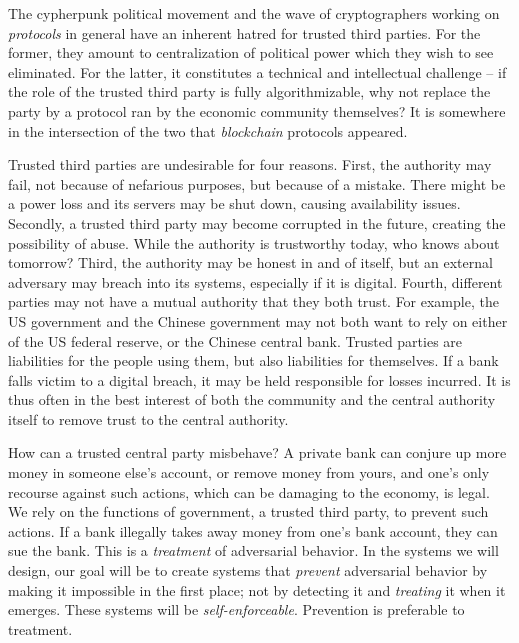 The cypherpunk political movement and the wave of
cryptographers working on \emph{protocols} in general have an inherent hatred
for trusted third parties. For the former, they amount to
centralization of political power which they wish to see eliminated. For the
latter, it constitutes a technical and intellectual challenge -- if the role of the trusted
third party is fully algorithmizable, why not replace the party by a protocol
ran by the economic community themselves? It is somewhere in the intersection of the
two that \emph{blockchain} protocols appeared.

Trusted third parties are undesirable for four reasons.
First, the authority may fail, not because of nefarious purposes, but because of a mistake.
There might be a power loss and its servers may be shut down, causing availability issues.
Secondly, a trusted third party
may become corrupted in the future, creating the possibility of abuse. While the authority
is trustworthy today, who knows about tomorrow?
Third, the
authority may be honest in and of itself, but an external adversary may breach into its
systems, especially if it is digital.
Fourth, different parties may not have a mutual authority that they both trust.
For example, the US government and the Chinese government may not both want to rely
on either of the US federal reserve, or the Chinese central bank.
Trusted parties are liabilities for the people using them, but also liabilities for
themselves. If a bank falls victim to a digital breach, it may be held responsible
for losses incurred. It is thus often in the best interest of both the community and
the central authority itself to remove trust to the central authority.

How can a trusted central party misbehave?
A private bank can conjure up more money in someone else's account, or remove money
from yours, and one's only recourse against such actions, which can be damaging
to the economy, is legal. We rely on the functions of government, a trusted third
party, to prevent such actions. If a bank illegally takes away money from one's
bank account, they can sue the bank. This is a \emph{treatment} of adversarial
behavior. In the systems we will design, our goal will be to create systems that
\emph{prevent} adversarial behavior by making it impossible in the first place;
not by detecting it and \emph{treating} it when it emerges.
These systems will be \emph{self-enforceable}.
Prevention is preferable to treatment.

